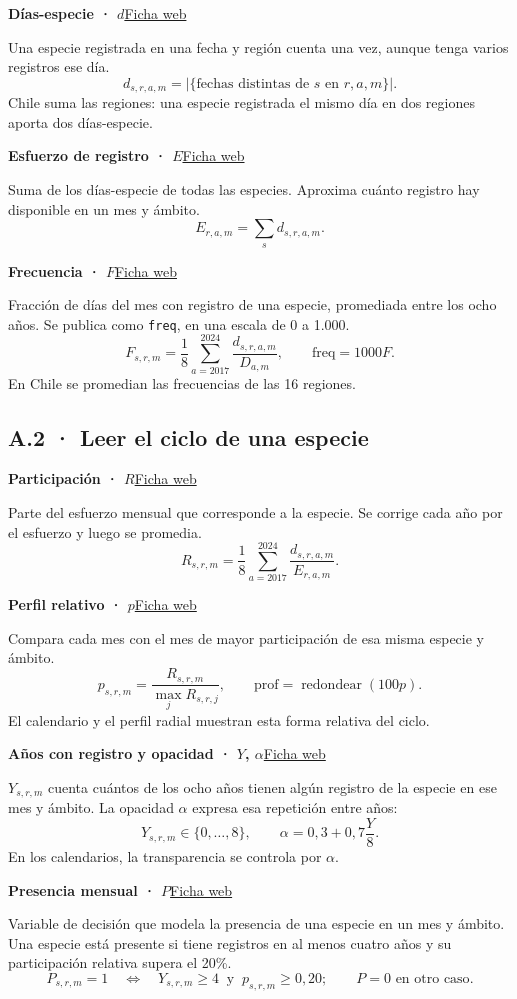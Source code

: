 \documentclass[11pt,a4paper]{article}
\newcommand{\Sitio}{https://canija2000.github.io/infovis_2026-2/}
\newcommand{\defconcepto}[3]{\par\needspace{6\baselineskip}\hypertarget{concepto:#1}{}\textbf{#2}\hfill\href{\Sitio metricas.html\##3}{\textcolor{acento}{\footnotesize Ficha web}}\par\nopagebreak}
\begin{document}
\defconcepto{dias-especie}{Días-especie · $d$}{dias-especie}
Una especie registrada en una fecha y región cuenta una vez, aunque tenga varios registros ese día.
\[
d_{s,r,a,m}=\bigl|\{\text{fechas distintas de }s\text{ en }r,a,m\}\bigr|.
\]
Chile suma las regiones: una especie registrada el mismo día en dos regiones aporta dos días-especie.

\defconcepto{esfuerzo}{Esfuerzo de registro · $E$}{esfuerzo}
Suma de los días-especie de todas las especies. Aproxima cuánto registro hay disponible en un mes y ámbito.
\[
E_{r,a,m}=\sum_s d_{s,r,a,m}.
\]

\defconcepto{frecuencia}{Frecuencia · $F$}{frecuencia}
Fracción de días del mes con registro de una especie, promediada entre los ocho años. Se publica como \texttt{freq}, en una escala de 0 a 1.000.
\[
F_{s,r,m}=\frac{1}{8}\sum_{a=2017}^{2024}\frac{d_{s,r,a,m}}{D_{a,m}},
\qquad \text{freq}=1000F.
\]
En Chile se promedian las frecuencias de las 16 regiones.

\clearpage
\subsection*{A.2 · Leer el ciclo de una especie}

\defconcepto{participacion}{Participación · $R$}{participacion}
Parte del esfuerzo mensual que corresponde a la especie. Se corrige cada año por el esfuerzo y luego se promedia.
\[
R_{s,r,m}=\frac{1}{8}\sum_{a=2017}^{2024}\frac{d_{s,r,a,m}}{E_{r,a,m}}.
\]

\defconcepto{perfil}{Perfil relativo · $p$}{perfil}
Compara cada mes con el mes de mayor participación de esa misma especie y ámbito.
\[
p_{s,r,m}=\frac{R_{s,r,m}}{\max_j R_{s,r,j}},
\qquad \text{prof}=\operatorname{redondear}(100p).
\]
El calendario y el perfil radial muestran esta forma relativa del ciclo.

\defconcepto{anios-registro}{Años con registro y opacidad · $Y$, $\alpha$}{anios-registro}
$Y_{s,r,m}$ cuenta cuántos de los ocho años tienen algún registro de la especie en ese mes y ámbito. La opacidad $\alpha$ expresa esa repetición entre años:
\[
Y_{s,r,m}\in\{0,\ldots,8\},
\qquad \alpha=0{,}3+0{,}7\frac{Y}{8}.
\]
En los calendarios, la transparencia se controla por $\alpha$.

\defconcepto{presente}{Presencia mensual · $P$}{presente}
Variable de decisión que modela la presencia de una especie en un mes y ámbito. Una especie está presente si tiene registros en al menos cuatro años y su participación relativa supera el 20\%.
\[
P_{s,r,m}=1\quad\Longleftrightarrow\quad
Y_{s,r,m}\geq4\ \text{ y }\ p_{s,r,m}\geq0{,}20;
\qquad P=0\text{ en otro caso}.
\]
\end{document}

